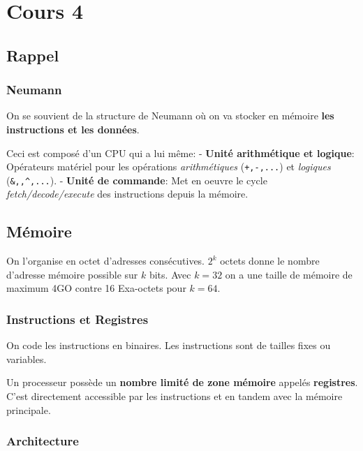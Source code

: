 \section{Cours 4}\label{cours-4}

\subsection{Rappel}\label{rappel}

\subsubsection{Neumann}\label{neumann}

On se souvient de la structure de Neumann où on va stocker en mémoire
\textbf{les instructions et les données}.

Ceci est composé d'un CPU qui a lui même: - \textbf{Unité arithmétique
et logique}: Opérateurs matériel pour les opérations
\emph{arithmétiques} (\texttt{+,-,...}) et \emph{logiques}
(\texttt{\&,\textbar{},\^{},...}). - \textbf{Unité de commande}: Met en
oeuvre le cycle \emph{fetch/decode/execute} des instructions depuis la
mémoire.

\subsection{Mémoire}\label{muxe9moire}

On l'organise en octet d'adresses consécutives. \(2^k\) octets donne le
nombre d'adresse mémoire possible sur \(k\) bits. Avec \(k=32\) on a une
taille de mémoire de maximum 4GO contre 16 Exa-octets pour \(k=64\).

\subsubsection{Instructions et
Registres}\label{instructions-et-registres}

On code les instructions en binaires. Les instructions sont de tailles
fixes ou variables.

Un processeur possède un \textbf{nombre limité de zone mémoire} appelés
\textbf{registres}. C'est directement accessible par les instructions et
en tandem avec la mémoire principale.

\subsubsection{Architecture}\label{architecture}

